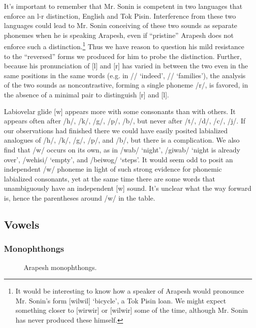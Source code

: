 \documentclass[pdftex,12pt,letterpaper]{article}
\let\ipa\textipa
\def\sw{\ipa{\super w}}
\begin{document}
 It's important to remember that Mr. Sonin is competent in two languages that enforce an l-r distinction, English and Tok Pisin. Interference from these two languages could lead to Mr. Sonin conceiving of these two sounds as separate phonemes when he is speaking Arapesh, even if ``pristine'' Arapesh does not enforce such a distinction.\footnote{It would be interesting to know how a speaker of Arapesh would pronounce Mr. Sonin's form [wilwil] `bicycle', a Tok Pisin loan. We might expect something closer to [wirwir] or [wilwir] some of the time, although Mr. Sonin has never produced these himself.} Thus we have reason to question his mild resistance to the ``reversed'' forms we produced for him to probe the distinction. Further, because his pronunciation of {[l]} and {[r]} has varied in between the two even in the same positions in the same words (e.g. in /\ipa{@d1r}/ `indeed', /\ipa{n1r1g@s}/ `families'), the analysis of the two sounds as noncontrastive, forming a single phoneme /r/, is favored, in the absence of a minimal pair to distinguish {[r]} and {[l]}.

 Labiovelar glide [w] appears more with some consonants than with others. It appears often after /h/, /k/, /g/, /p/, /b/, but never after /t/, /d/, /c/, /j/. If our observations had finished there we could have easily posited labialized analogues of /h/, /k/, /g/, /p/, and /b/, but there is a complication. We also find that /w/ occurs on its own, as in /wab/ `night', /giwab/ `night is already over', /wehisi/ `empty', and /beiwog\sw/ `steps'. It would seem odd to posit an independent /w/ phoneme in light of such strong evidence for phonemic labialized consonants, yet at the same time there are some words that unambiguously have an independent [w] sound. It's unclear what the way forward is, hence the parentheses around /w/ in the table.
  
 \subsection{Vowels}

 \subsubsection{Monophthongs}

 \begin{wrapfigure}{r}{.4\textwidth}
 \begin{center}
 {\large
 \begin{vowel}
   \putvowel{\ipa{1}}{63pt}{20pt}
   \putcvowel{\ipa{@}}{11}
   \putcvowel{\ipa{5}}{15}
 \end{vowel}
 }
 \caption{Arapesh monophthongs.}
 \end{center}
 \end{wrapfigure}
\end{document}

